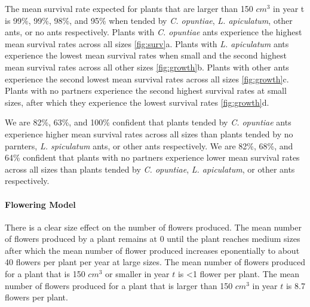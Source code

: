 \documentclass[11pt]{article}
\begin{document}
The mean survival rate expected for plants that are larger than 150 $cm^3$ in year t is 99\%, 99\%, 98\%, and 95\% when tended by \textit{C. opuntiae}, \textit{L. apiculatum}, other ants, or no ants respectively. 
Plants with \textit{C. opuntiae} ants experience the highest mean survival rates across all sizes \ref{fig:surv}a.
Plants with \textit{L. apiculatum} ants experience the lowest mean survival rates when small and the second highest mean survival rates across all other sizes \ref{fig:growth}b. 
Plants with other ants experience the second lowest mean survival rates across all sizes \ref{fig:growth}c.
Plants with no partners experience the second highest survival rates at small sizes, after which they experience the lowest survival rates \ref{fig:growth}d. 

We are 82\%, 63\%, and 100\% confident that plants tended by \textit{C. opuntiae} ants experience higher mean survival rates across all sizes than plants tended by no parnters, \textit{L. spiculatum} ants, or other ants respectively.
We are 82\%, 68\%, and 64\% confident that plants with no partners experience lower mean survival rates across all sizes than plants tended by \textit{C. opuntiae}, \textit{L. apiculatum}, or other ants respectively.

\paragraph{Flowering Model}
There is a clear size effect on the number of flowers produced. 
The mean number of flowers produced by a plant remains at 0 until the plant reaches medium sizes after which the mean number of flower produced increases eponentially to about 40 flowers per plant per year at large sizes.
The mean number of flowers produced for a plant that is 150 $cm^3$ or smaller in year $t$ is <1 flower per plant.
The mean number of flowers produced for a plant that is larger than 150 $cm^3$ in year $t$ is 8.7 flowers per plant.


\end{document}
